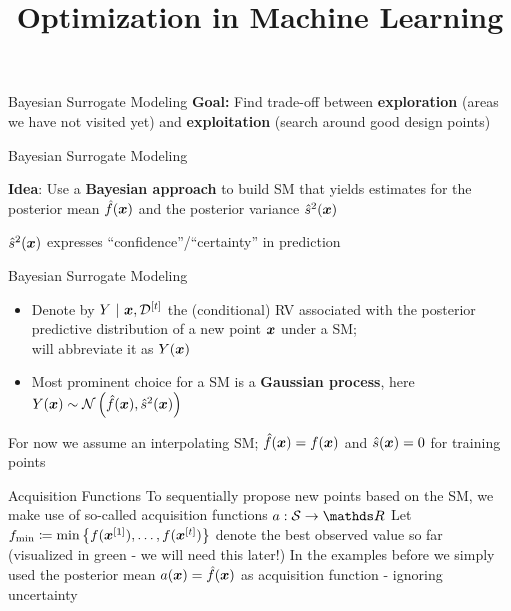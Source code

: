 \documentclass[11pt,compress,t,notes=noshow, xcolor=table]{beamer}
\title{Optimization in Machine Learning}
\begin{document}

\begin{framev}{Bayesian Surrogate Modeling}
\textbf{Goal:}
Find trade-off between \textbf{exploration} (areas we have not visited yet) and \textbf{exploitation} (search around good design points)
\vfill
{}
\end{framev}


\begin{framei}{Bayesian Surrogate Modeling}
\item \textbf{Idea}: Use a \textbf{Bayesian approach} to build SM that yields estimates for the posterior mean $\hat{f}(\bm{x})$ and the posterior variance $\hat{s}^2(\bm{x})$
\item $\hat{s}^2(\bm{x})$ expresses \enquote{confidence}/\enquote{certainty} in prediction
\vfill
{}
\end{framei}


\begin{framev}{Bayesian Surrogate Modeling}
\begin{itemize}
\item Denote by $Y~|~\bm{x}, \mathcal{D}^{[t]}$ the (conditional) RV associated with the posterior predictive distribution of a new point $\bm{x}$ under a SM;\\
will abbreviate it as $Y(\bm{x})$
\item Most prominent choice for a SM is a \textbf{Gaussian process}, here $Y(\bm{x}) \sim \mathcal{N}\left(\hat{f}(\bm{x}), \hat{s}^2(\bm{x})\right)$
\end{itemize}
\vfill
{}
\begin{footnotesize}
For now we assume an interpolating SM; $\hat{f}(\bm{x}) = f(\bm{x})$ and $\hat{s}(\bm{x}) = 0$ for training points
\end{footnotesize}
\end{framev}


\begin{framev}{Acquisition Functions}
To sequentially propose new points based on the SM, we make use of so-called acquisition functions $a: \mathcal{S} \to \R$
\vfill
Let $f_{\min} \coloneqq \min \left\{f(\bm{x}^{[1]}), \ldots, f(\bm{x}^{[t]})\right\}$ denote the best observed value so far (visualized in green - we will need this later!)
In the examples before we simply used the posterior mean $a(\bm{x}) = \hat{f}(\bm{x})$ as acquisition function - ignoring uncertainty
\end{framev}
\end{document}
